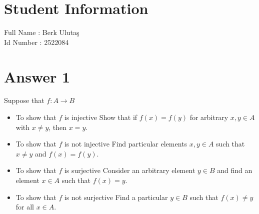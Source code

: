 \documentclass[12pt]{article}
\begin{document}
\section*{Student Information } 
Full Name : Berk Ulutaş \\
Id Number :  2522084 \\

\section*{Answer 1}
Suppose that $f : A \rightarrow B$
\begin{itemize}
    \item To show that $f$ is injective Show that if $f(x) = f(y)$ for arbitrary $x,y \in A$ with $x \neq y $, then $x= y$.
    \item To show that $f$ is not injective Find particular elements $x,y \in A$ such that $x\neq y$ and $f(x) = f(y)$.
    \item To show that $f$ is surjective Consider an arbitrary element $y\in B$ and find an element $x\in A$ such that $f(x)=y$.
    \item To show that $f$ is not surjective Find a particular $y\in B$ such that $f(x) \neq y$ for all $x\in A$.
\end{itemize}
\hfill
\end{document}
